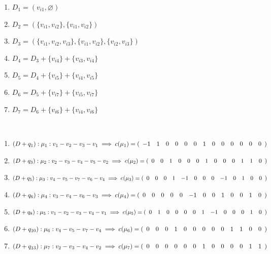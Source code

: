 \documentclass[12pt,a4paper]{article}
\begin{document}
   \begin{minipage}{0.6\textwidth}
   \begin{enumerate}[leftmargin=*]
      \item $D_1 = (v_{i1}, \varnothing)$
      \item $D_2 = (\{v_{i1},v_{i2}\},\{v_{i1},v_{i2}\})$
      \item $D_3 = (\{v_{i1},v_{i2},v_{i3}\},\{v_{i1},v_{i2}\},\{v_{i2},v_{i3}\})$
      \item $D_4 = D_3 + \{v_{i4}\} + \{v_{i3},v_{i4}\}$
      \item $D_5 = D_4 + \{v_{i5}\} + \{v_{i4},v_{i5}\}$
      \item $D_6 = D_5 + \{v_{i7}\} + \{v_{i5},v_{i7}\}$
      \item $D_7 = D_6 + \{v_{i6}\} + \{v_{i4},v_{i6}\}$
   \end{enumerate}
   \end{minipage}\\[40pt]
   \begin{minipage}{0.6\textwidth}
      \begin{enumerate}[leftmargin=*]
         \item $(D + q_1):\mu_1:v_1 - v_2 - v_3 - v_1 \implies c(\mu_1) = (\begin{array}{*{13}c}-1 & 1 & 0 & 0 & 0 & 0 & 1 & 0 & 0 & 0 & 0 & 0 & 0\end{array})$
         \item $(D + q_3):\mu_2:v_2 - v_3 - v_4 - v_5 - v_2 \implies c(\mu_2) = (\begin{array}{*{13}c}0 & 0 & 1 & 0 & 0 & 0 & 1 & 0 & 0 & 0 & 1 & 1 & 0\end{array})$
         \item $(D + q_5):\mu_3:v_4 - v_5 - v_7 - v_6 - v_4 \implies c(\mu_3) = (\begin{array}{*{13}c}0 & 0 & 0 & 1 & -1 & 0 & 0 & 0 & -1 & 0 & 1 & 0 & 0\end{array})$
         \item $(D + q_6):\mu_4:v_3 - v_4 - v_6 - v_3 \implies c(\mu_4) = (\begin{array}{*{13}c}0 & 0 & 0 & 0 & 0 & -1 & 0 & 0 & 1 & 0 & 0 & 1 & 0\end{array})$ 
         \item $(D + q_8):\mu_5:v_1 - v_2 - v_3 - v_4 - v_1 \implies c(\mu_5) = (\begin{array}{*{13}c}0 & 1 & 0 & 0 & 0 & 0 & 1 & -1 & 0 & 0 & 0 & 1 & 0\end{array})$ 
         \item $(D + q_{10}):\mu_6:v_4 - v_5 - v_7 - v_4 \implies c(\mu_6) = (\begin{array}{*{13}c}0 & 0 & 0 & 1 & 0 & 0 & 0 & 0 & 0 & 1 & 1 & 0 & 0\end{array})$ 
         \item $(D + q_{13}):\mu_7:v_2 - v_3 - v_4 - v_2 \implies c(\mu_7) = (\begin{array}{*{13}c}0 & 0 & 0 & 0 & 0 & 0 & 1 & 0 & 0 & 0 & 0 & 1 & 1\end{array})$ 
      \end{enumerate}
   \end{minipage}
\end{document}
